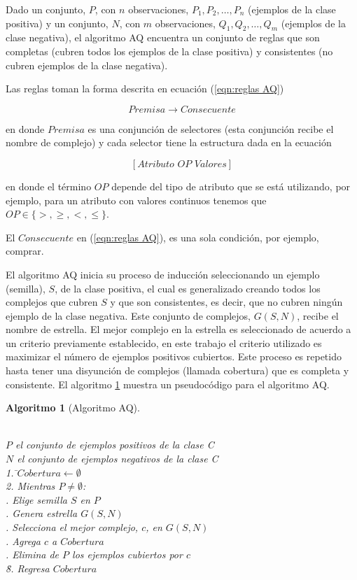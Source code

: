 \documentclass[12pt]{scrbook}
\theoremstyle{break}
\theoremstyle{break}
\newtheorem{algoritmo}{Algoritmo}[chapter]
\begin{document}
Dado un conjunto, $P$, con $n$ observaciones, $P_1, P_2, \ldots, P_n$ (ejemplos de la clase positiva)  y un conjunto, $N$, con $m$ observaciones, $Q_1, Q_2, \ldots, Q_m$ (ejemplos de la clase negativa), el algoritmo AQ encuentra un conjunto de reglas que son completas (cubren todos los ejemplos de la clase positiva) y consistentes (no cubren ejemplos de la clase negativa).

Las reglas toman la forma descrita en ecuación (\ref{eqn:reglas AQ})

\begin{equation} \label{eqn:reglas AQ}
Premisa \rightarrow Consecuente
\end{equation}

en donde $Premisa$ es una conjunción de selectores (esta conjunción recibe el nombre de complejo) y cada selector tiene la estructura dada en la ecuación 

\begin{equation} \label{eqn:condicion AQ}
\left[Atributo\,\, OP\,\, Valores \right]
\end{equation}

en donde el término $OP$ depende del tipo de atributo que se está utilizando, por ejemplo, para un atributo con valores continuos tenemos que $OP \in \{>, \geq, <, \leq\}$.

El $Consecuente$ en (\ref{eqn:reglas AQ}), es una sola condición, por ejemplo, comprar.

El algoritmo AQ inicia su proceso de inducción seleccionando un ejemplo (semilla), $S$, de la clase positiva, el cual es generalizado creando todos los complejos que cubren $S$ y que son consistentes, es decir, que no cubren ningún ejemplo de la clase negativa. Este conjunto de complejos, $G(S,N)$, recibe el nombre de estrella. El mejor complejo en la estrella es seleccionado de acuerdo a un criterio previamente establecido, en este trabajo el criterio utilizado es maximizar el número de ejemplos positivos cubiertos. Este proceso es repetido hasta tener una disyunción de complejos (llamada cobertura) que es completa y consistente. El algoritmo \ref{algo:AQ} muestra un pseudocódigo para el algoritmo AQ.

\begin{algoritmo}[Algoritmo AQ]
\begin{tabbing}
\\$P$ el conjunto de ejemplos positivos de la clase C
\\$N$ el conjunto de ejemplos negativos de la clase C\\
1. \=$Cobertura\leftarrow \emptyset $ \\
2. Mientras $P \neq \emptyset$:\\
 . Elige semilla $S$ en $P$\\
 . Genera estrella $G(S,N)$\\
 . Selecciona el mejor complejo, $c$, en $G(S,N)$\\
 . Agrega $c$ a $Cobertura$\\
 . Elimina de $P$ los ejemplos cubiertos por $c$\\
\=8. Regresa $Cobertura$
\end{tabbing}
\label{algo:AQ}
\end{algoritmo}
\end{document}
